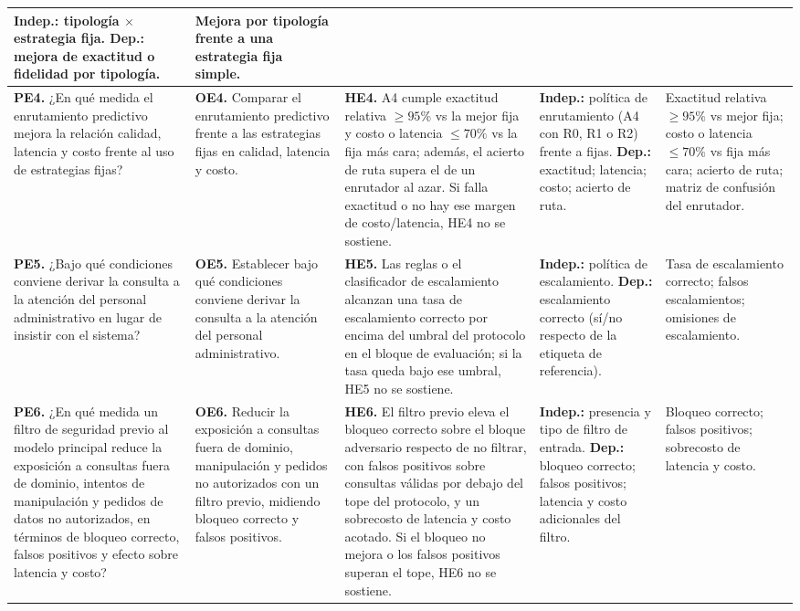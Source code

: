 \documentclass[10pt,a4paper,landscape]{article}
\begin{document}
{\begin{tabularx}{\linewidth}{|Y|Y|Y|Y|Y|}
\textbf{Indep.:} tipología $\times$ estrategia fija. \textbf{Dep.:} mejora de exactitud o fidelidad por tipología. &
Mejora por tipología frente a una estrategia fija simple. \\
\hline
\textbf{PE4.} ¿En qué medida el enrutamiento predictivo mejora la relación calidad, latencia y costo frente al uso de estrategias fijas? &
\textbf{OE4.} Comparar el enrutamiento predictivo frente a las estrategias fijas en calidad, latencia y costo. &
\textbf{HE4.} A4 cumple exactitud relativa $\geq 95\%$ vs la mejor fija y costo o latencia $\leq 70\%$ vs la fija más cara; además, el acierto de ruta supera el de un enrutador al azar. Si falla exactitud o no hay ese margen de costo/latencia, HE4 no se sostiene. &
\textbf{Indep.:} política de enrutamiento (A4 con R0, R1 o R2) frente a fijas. \textbf{Dep.:} exactitud; latencia; costo; acierto de ruta. &
Exactitud relativa $\geq 95\%$ vs mejor fija; costo o latencia $\leq 70\%$ vs fija más cara; acierto de ruta; matriz de confusión del enrutador. \\
\hline
\textbf{PE5.} ¿Bajo qué condiciones conviene derivar la consulta a la atención del personal administrativo en lugar de insistir con el sistema? &
\textbf{OE5.} Establecer bajo qué condiciones conviene derivar la consulta a la atención del personal administrativo. &
\textbf{HE5.} Las reglas o el clasificador de escalamiento alcanzan una tasa de escalamiento correcto por encima del umbral del protocolo en el bloque de evaluación; si la tasa queda bajo ese umbral, HE5 no se sostiene. &
\textbf{Indep.:} política de escalamiento. \textbf{Dep.:} escalamiento correcto (sí/no respecto de la etiqueta de referencia). &
Tasa de escalamiento correcto; falsos escalamientos; omisiones de escalamiento. \\
\hline
\textbf{PE6.} ¿En qué medida un filtro de seguridad previo al modelo principal reduce la exposición a consultas fuera de dominio, intentos de manipulación y pedidos de datos no autorizados, en términos de bloqueo correcto, falsos positivos y efecto sobre latencia y costo? &
\textbf{OE6.} Reducir la exposición a consultas fuera de dominio, manipulación y pedidos no autorizados con un filtro previo, midiendo bloqueo correcto y falsos positivos. &
\textbf{HE6.} El filtro previo eleva el bloqueo correcto sobre el bloque adversario respecto de no filtrar, con falsos positivos sobre consultas válidas por debajo del tope del protocolo, y un sobrecosto de latencia y costo acotado. Si el bloqueo no mejora o los falsos positivos superan el tope, HE6 no se sostiene. &
\textbf{Indep.:} presencia y tipo de filtro de entrada. \textbf{Dep.:} bloqueo correcto; falsos positivos; latencia y costo adicionales del filtro. &
Bloqueo correcto; falsos positivos; sobrecosto de latencia y costo. \\
\hline
\end{tabularx}
}
\end{document}
